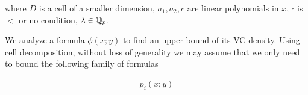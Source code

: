 \documentclass{amsart}
\newcommand{\curly}[1]{\left\{#1\right\}}
\begin{document}
where $D$ is a cell of a smaller dimension, $a_1, a_2, c$ are linear polynomials in  $x$, $\square$ is $<$ or no condition, $\lambda  \in\mathbb{Q}_p$.

We analyze a formula $\phi(x; y)$ to find an upper bound of its VC-density. 
Using cell decomposition, without loss of generality we may assume that we only need to bound the following family of formulas

\begin{align*}
	p_i(x; y)
\end{align*}

%

\end{document}
